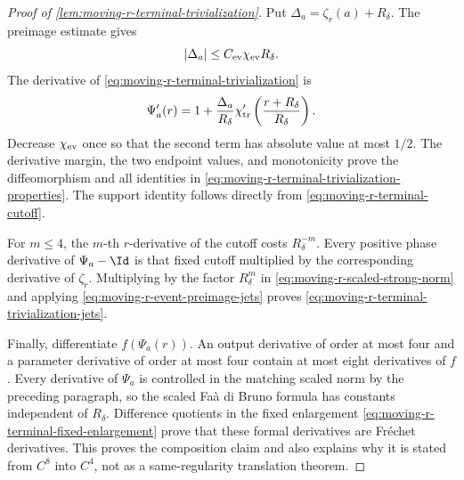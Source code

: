\begin{proof}[Proof of
\cref{lem:moving-r-terminal-trivialization}]
Put \(\Delta_a=\zeta_r(a)+R_\delta\).  The preimage estimate gives
\begin{equation}
 |\Delta_a|\le C_{\rm ev}\chi_{\rm ev}R_\delta.             \label{eq:proof-moving-r-trivialization-shift}
\end{equation}
The derivative of \cref{eq:moving-r-terminal-trivialization} is
\begin{equation}
 \Psi_a'(r)
 =1+\frac{\Delta_a}{R_\delta}
   \chi_{\rm tr}'\left(\frac{r+R_\delta}{R_\delta}\right). \label{eq:proof-moving-r-trivialization-derivative}
\end{equation}
Decrease \(\chi_{\rm ev}\) once so that the second term has absolute
value at most \(1/2\).  The derivative margin, the two endpoint values,
and monotonicity prove the diffeomorphism and all identities in
\cref{eq:moving-r-terminal-trivialization-properties}.  The support
identity follows directly from
\cref{eq:moving-r-terminal-cutoff}.

For \(m\le4\), the \(m\)-th \(r\)-derivative of the cutoff costs
\(R_\delta^{-m}\).  Every positive phase derivative of
\(\Psi_a-\Id\) is that fixed cutoff multiplied by the corresponding
derivative of \(\zeta_r\).  Multiplying by the factor \(R_\delta^m\) in
\cref{eq:moving-r-scaled-strong-norm} and applying
\cref{eq:moving-r-event-preimage-jets} proves
\cref{eq:moving-r-terminal-trivialization-jets}.

Finally, differentiate \(f(\Psi_a(r))\).  An output derivative of order
at most four and a parameter derivative of order at most four contain at
most eight derivatives of \(f\).  Every derivative of \(\Psi_a\) is
controlled in the matching scaled norm by the preceding paragraph, so
the scaled Fa\`a di Bruno formula has constants independent of
\(R_\delta\).  Difference quotients in the fixed enlargement
\cref{eq:moving-r-terminal-fixed-enlargement} prove that these formal
derivatives are Fr\'{e}chet derivatives.  This proves the composition
claim and also explains why it is stated from \(C^8\) into \(C^4\), not
as a same-regularity translation theorem.
\end{proof}

